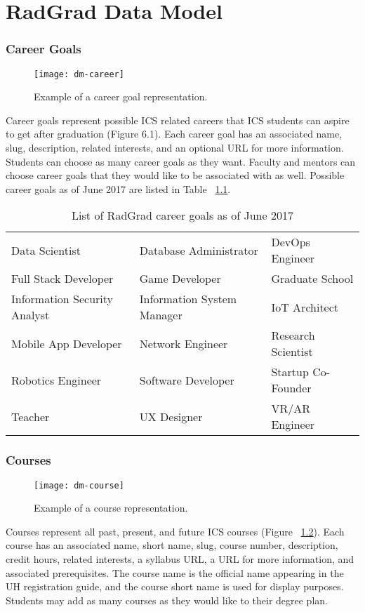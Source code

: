 \chapter{RadGrad Data Model}
\label{data-model}
\subsection{Career Goals}
\begin{figure}[htbp!]
\centering
\texttt{[image: dm-career]}
\caption{Example of a career goal representation.}
\label{career-goal}
\end{figure}
Career goals represent possible ICS related careers that ICS students can aspire to get after graduation (Figure 6.1). Each career goal has an associated name, slug, description, related interests, and an optional URL for more information. Students can choose as many career goals as they want. Faculty and mentors can choose career goals that they would like to be associated with as well. Possible career goals as of June 2017 are listed in Table ~\ref{table:career-goals}.

\begin{table}[htbp!]
\centering
\begin{tabular}{ l l l } 
 Data Scientist & Database Administrator & DevOps Engineer \\ 
 Full Stack Developer & Game Developer & Graduate School \\ 
 Information Security Analyst & Information System Manager & IoT Architect \\ 
 Mobile App Developer & Network Engineer & Research Scientist \\
 Robotics Engineer & Software Developer & Startup Co-Founder \\
 Teacher & UX Designer & VR/AR Engineer 
\end{tabular}
\caption{List of RadGrad career goals as of June 2017}
\label{table:career-goals}
\end{table}

\subsection{Courses}
\begin{figure}[htbp!]
\centering
\texttt{[image: dm-course]}
\caption{Example of a course representation.}
\label{course}
\end{figure}
Courses represent all past, present, and future ICS courses (Figure ~\ref{course}). Each course has an associated name, short name, slug, course number, description, credit hours, related interests, a syllabus URL, a URL for more information, and associated prerequisites. The course name is the official name appearing in the UH registration guide, and the course short name is used for display purposes. Students may add as many courses as they would like to their degree plan. 

